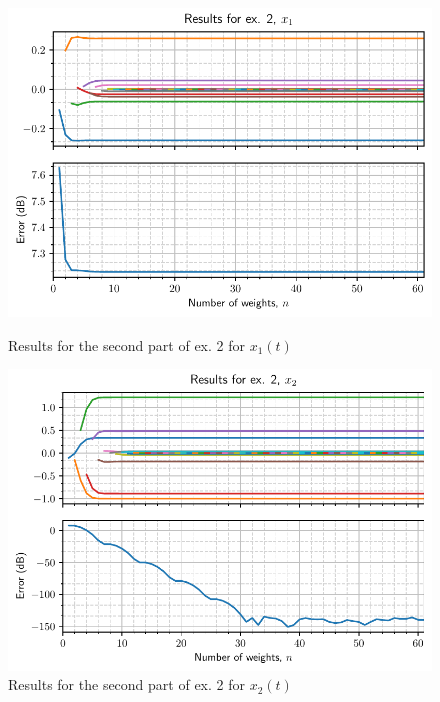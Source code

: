 \begin{figure}
    \centering
    \begin{minipage}[t]{0.30\columnwidth}
        \centering
        \includegraphics[width=\columnwidth]{figures/pdf/ex2_pt2_x1_all.pdf}
        \caption{Results for the second part of ex. 2 for \(x_1(t)\)
            \label{fig:ex22x1}}
    \end{minipage}
    \hspace{1cm}
    \begin{minipage}[t]{0.30\columnwidth}
        \centering
        \includegraphics[width=\columnwidth]{figures/pdf/ex2_pt2_x2_all.pdf}
        \caption{Results for the second part of ex. 2 for \(x_2(t)\)
            \label{fig:ex22x2}}
    \end{minipage}
\end{figure}
